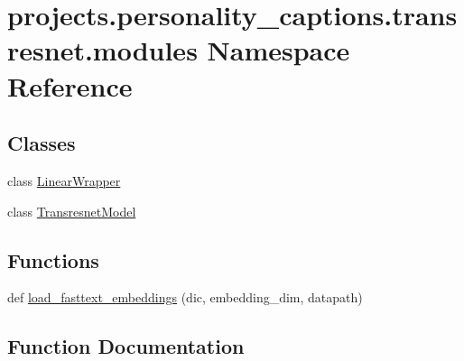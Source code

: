 \hypertarget{namespaceprojects_1_1personality__captions_1_1transresnet_1_1modules}{}\section{projects.\+personality\+\_\+captions.\+transresnet.\+modules Namespace Reference}
\label{namespaceprojects_1_1personality__captions_1_1transresnet_1_1modules}
\subsection*{Classes}
\begin{DoxyCompactItemize}
\item 
class \hyperlink{classprojects_1_1personality__captions_1_1transresnet_1_1modules_1_1LinearWrapper}{Linear\+Wrapper}
\item 
class \hyperlink{classprojects_1_1personality__captions_1_1transresnet_1_1modules_1_1TransresnetModel}{Transresnet\+Model}
\end{DoxyCompactItemize}
\subsection*{Functions}
\begin{DoxyCompactItemize}
\item 
def \hyperlink{namespaceprojects_1_1personality__captions_1_1transresnet_1_1modules_a96bada548530832446cf3ca02442b9d4}{load\+\_\+fasttext\+\_\+embeddings} (dic, embedding\+\_\+dim, datapath)
\end{DoxyCompactItemize}


\subsection{Function Documentation}
\mbox{\label{namespaceprojects_1_1personality__captions_1_1transresnet_1_1modules_a96bada548530832446cf3ca02442b9d4}} 
